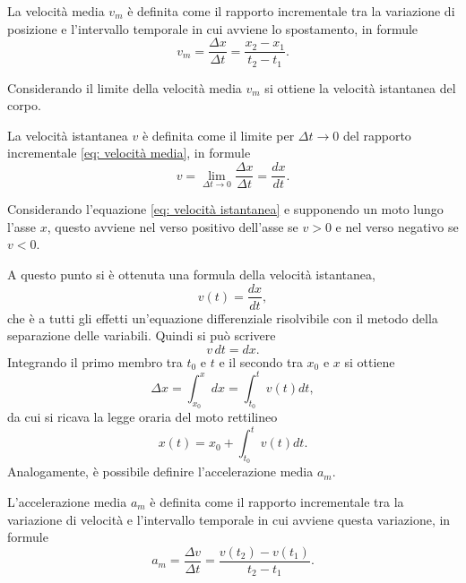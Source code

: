\begin{defn}
    La velocità media $v_m$ è definita come il rapporto incrementale tra la variazione di posizione e l'intervallo temporale in cui avviene lo spostamento, in formule 
    \begin{equation}
    \label{eq: velocità media}
        v_m=\frac{\Delta x}{\Delta t}=\frac{x_2-x_1}{t_2-t_1}.
    \end{equation}
\end{defn}
Considerando il limite della velocità media $v_m$ si ottiene la velocità istantanea del corpo.
\begin{defn}
    La velocità istantanea $v$ è definita come il limite per $\Delta t\to0$ del rapporto incrementale \eqref{eq: velocità media}, in formule
    \begin{equation}
    \label{eq: velocità istantanea}
        v=\lim_{\Delta t\to0}{\frac{\Delta x}{\Delta t}}=\frac{dx}{dt}.
    \end{equation}
\end{defn}
\begin{obs}
    Considerando l'equazione \eqref{eq: velocità istantanea} e supponendo un moto lungo l'asse $x$, questo avviene nel verso positivo dell'asse se $v>0$ e nel verso negativo se $v<0$.
\end{obs}
A questo punto si è ottenuta una formula della velocità istantanea,
\begin{equation}
    v(t)=\frac{dx}{dt},
\end{equation}
che è a tutti gli effetti un'equazione differenziale risolvibile con il metodo della separazione delle variabili. Quindi si può scrivere
\begin{equation}
    v\,dt=dx.
\end{equation}
Integrando il primo membro tra $t_0$ e $t$ e il secondo tra $x_0$ e $x$ si ottiene
\begin{equation}
    \Delta x=\int_{x_0}^{x}{dx}=\int_{t_0}^{t}{v(t)dt},
\end{equation}
da cui si ricava la legge oraria del moto rettilineo
\begin{equation}\label{eq: legge oraria moto rettilineo}
    x(t)=x_0+\int_{t_0}^{t}{v(t)dt}.
\end{equation}
Analogamente, è possibile definire l'accelerazione media $a_m$.
\begin{defn}
    L'accelerazione media $a_m$ è definita come il rapporto incrementale tra la variazione di velocità e l'intervallo temporale in cui avviene questa variazione, in formule 
    \begin{equation}
    \label{eq: accelerazione media}
        a_m=\frac{\Delta v}{\Delta t}=\frac{v(t_2)-v(t_1)}{t_2-t_1}.
    \end{equation}
\end{defn}
